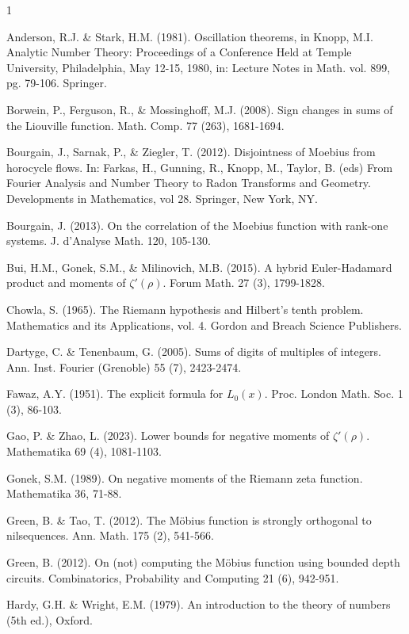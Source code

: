 \documentclass[11pt,article]{amsart}
\numberwithin{equation}{section}
\numberwithin{equation}{section}
\numberwithin{lemma}{section}
\numberwithin{prop}{section}
\begin{document}
\begin{thebibliography}{1}

Anderson, R.J. \& Stark, H.M. (1981). Oscillation theorems, in Knopp, M.I. Analytic Number Theory: Proceedings of a Conference Held at Temple University, Philadelphia, May 12-15, 1980, in: Lecture Notes in Math. vol. 899, pg. 79-106. Springer. 

Borwein, P., Ferguson, R., \& Mossinghoff, M.J. (2008). Sign changes in sums of the Liouville function. Math. Comp. 77 (263), 1681-1694. 

Bourgain, J., Sarnak, P., \& Ziegler, T. (2012). Disjointness of Moebius from horocycle flows. In: Farkas, H., Gunning, R., Knopp, M., Taylor, B. (eds) From Fourier Analysis and Number Theory to Radon Transforms and Geometry. Developments in Mathematics, vol 28. Springer, New York, NY.

Bourgain, J. (2013). On the correlation of the Moebius function with rank-one systems. J. d'Analyse Math. 120, 105-130.

Bui, H.M., Gonek, S.M., \& Milinovich, M.B. (2015). A hybrid Euler-Hadamard product and moments of $\zeta'(\rho)$. Forum Math. 27 (3), 1799-1828. 

Chowla, S. (1965). The Riemann hypothesis and Hilbert's tenth problem. Mathematics and its Applications, vol. 4. Gordon and Breach Science Publishers. 

Dartyge, C. \& Tenenbaum, G. (2005). Sums of digits of multiples of integers. Ann. Inst. Fourier (Grenoble) 55 (7), 2423-2474. 

Fawaz, A.Y. (1951). The explicit formula for $L_{0}(x)$. Proc. London Math. Soc. 1 (3), 86-103. 

Gao, P. \& Zhao, L. (2023). Lower bounds for negative moments of $\zeta'(\rho)$. Mathematika 69 (4), 1081-1103. 

Gonek, S.M. (1989). On negative moments of the Riemann zeta function. Mathematika 36, 71-88.

Green, B. \& Tao, T. (2012). The M{\"o}bius function is strongly orthogonal to nilsequences. Ann. Math. 175 (2), 541-566.

Green, B. (2012). On (not) computing the M{\"o}bius function using bounded depth circuits. Combinatorics, Probability and Computing 21 (6), 942-951.

Hardy, G.H. \& Wright, E.M. (1979). An introduction to the theory of numbers (5th ed.), Oxford. 


\end{thebibliography}
\end{document}
